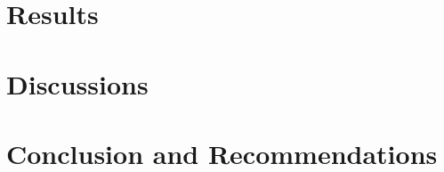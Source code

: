 \documentclass[14pt]{report}
\begin{document}
\pagebreak
\chapter{Results}


\pagebreak
\chapter{Discussions}



\pagebreak
\chapter{Conclusion and Recommendations}



\pagebreak
{}
\cleardoublepage


\appendix

\cleardoublepage










\end{document}
